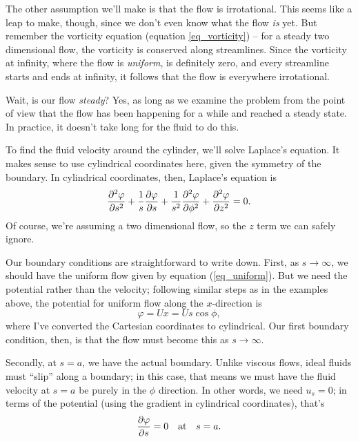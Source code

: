 The other assumption we'll make is that the flow is irrotational.  This seems like a leap to make, though, since we don't even know what the flow \emph{is} yet.  But remember the vorticity equation (equation \ref{eq_vorticity}) -- for a steady two dimensional flow, the vorticity is conserved along streamlines.  Since the vorticity at infinity, where the flow is \emph{uniform}, is definitely zero, and every streamline starts and ends at infinity, it follows that the flow is everywhere irrotational.

Wait, is our flow \emph{steady}?  Yes, as long as we examine the problem from the point of view that the flow has been happening for a while and reached a steady state.  In practice, it doesn't take long for the fluid to do this.

To find the fluid velocity around the cylinder, we'll solve Laplace's equation.  It makes sense to use cylindrical coordinates here, given the symmetry of the boundary.  In cylindrical coordinates, then, Laplace's equation is
\begin{equation}
\label{eq_laplace_cyl}
\frac{\partial^2 {\varphi}}{\partial {s}^2} + \frac{1}{s} \frac{\partial {\varphi}}{\partial {s}} + \frac{1}{s^2} \frac{\partial^2 {\varphi}}{\partial {\phi}^2} + \frac{\partial^2 {\varphi}}{\partial {z}^2} = 0.
\end{equation}
Of course, we're assuming a two dimensional flow, so the $z$ term we can safely ignore.

Our boundary conditions are straightforward to write down.  First, as $s \to \infty$, we should have the uniform flow given by equation (\ref{eq_uniform}).  But we need the potential rather than the velocity; following similar steps as in the examples above, the potential for uniform flow along the $x$-direction is
\begin{equation}
\label{eq_cyl_bc1}
\varphi = Ux = U s \cos \phi,
\end{equation}
where I've converted the Cartesian coordinates to cylindrical.  Our first boundary condition, then, is that the flow must become this as $s \to \infty$.

Secondly, at $s=a$, we have the actual boundary.  Unlike viscous flows, ideal fluids must ``slip'' along a boundary; in this case, that means we must have the fluid velocity at $s=a$ be purely in the $\unit{\phi}$ direction.  In other words, we need $u_s = 0$; in terms of the potential (using the gradient in cylindrical coordinates), that's
\begin{equation}
\label{eq_cyl_bc2}
\frac{\partial {\varphi}}{\partial {s}} = 0 \quad \text{at} \quad s=a.
\end{equation}

